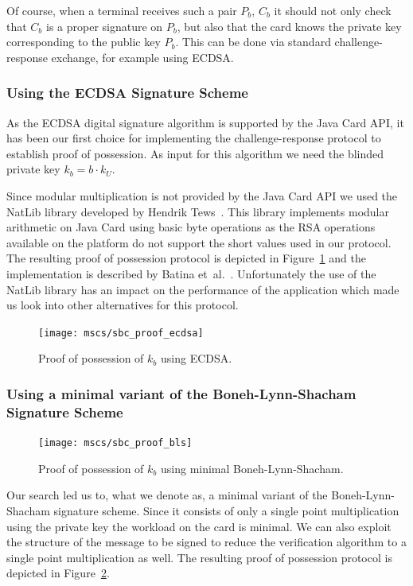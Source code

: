 Of course, when a terminal receives such a pair $P_b$, $C_b$ it should not only
check that $C_b$ is a proper signature on $P_b$, but also that the card knows
the private key corresponding to the public key $P_b$. This can be done via
standard challenge-response exchange, for example using ECDSA.

\subsubsection{Using the ECDSA Signature Scheme}

As the ECDSA digital signature algorithm is supported by the Java Card API, it
has been our first choice for implementing the challenge-response protocol to
establish proof of possession. As input for this algorithm we need the blinded
private key $k_b = b \cdot k_U$.

Since modular multiplication is not provided by the Java Card API we used the
NatLib library developed by Hendrik Tews~\cite{TewsJacobs09}. This library
implements modular arithmetic on Java Card using basic byte operations as the
RSA operations available on the platform do not support the short values used in
our protocol. The resulting proof of possession protocol is depicted in
Figure~\ref{fig:SBC-proof-ECDSA} and the implementation is described by Batina
et~al.~\cite{BatinaHJMV10}. Unfortunately the use of the NatLib library has an
impact on the performance of the application which made us look into other
alternatives for this protocol.

\begin{figure}[ht]
  \centering
  \texttt{[image: mscs/sbc\_proof\_ecdsa]}
  \caption{Proof of possession of $k_b$ using ECDSA.}
  \label{fig:SBC-proof-ECDSA}
\end{figure}

\subsubsection{Using a minimal variant of the Boneh-Lynn-Shacham Signature Scheme}

\begin{figure}
  \centering
  \texttt{[image: mscs/sbc\_proof\_bls]}
  \caption{Proof of possession of $k_b$ using minimal Boneh-Lynn-Shacham.}
  \label{fig:SBC-proof-BLS}
\end{figure}

Our search led us to, what we denote as, a minimal variant of the
Boneh-Lynn-Shacham signature scheme. Since it consists of only a single point
multiplication using the private key the workload on the card is minimal. We can
also exploit the structure of the message to be signed to reduce the
verification algorithm to a single point multiplication as well. The resulting
proof of possession protocol is depicted in Figure~\ref{fig:SBC-proof-BLS}.

